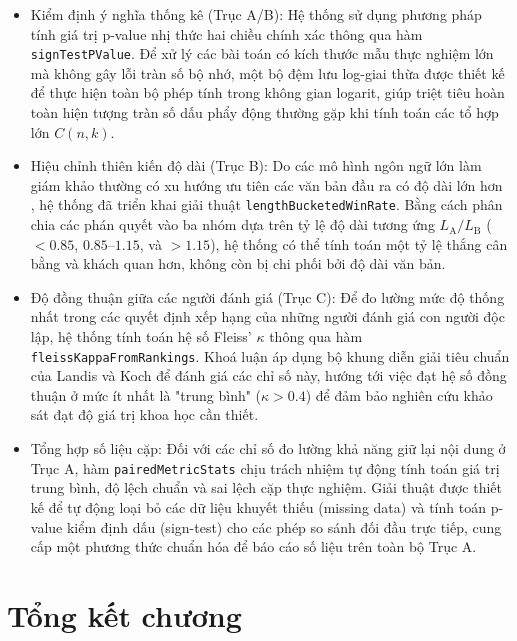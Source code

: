 \begin{itemize}
  \item Kiểm định ý nghĩa thống kê (Trục A/B): Hệ thống sử dụng phương pháp tính giá trị p-value nhị thức hai chiều chính xác thông qua hàm \texttt{signTestPValue}. Để xử lý các bài toán có kích thước mẫu thực nghiệm lớn mà không gây lỗi tràn số bộ nhớ, một bộ đệm lưu log-giai thừa được thiết kế để thực hiện toàn bộ phép tính trong không gian logarit, giúp triệt tiêu hoàn toàn hiện tượng tràn số dấu phẩy động thường gặp khi tính toán các tổ hợp lớn $C(n, k)$.
  \item Hiệu chỉnh thiên kiến độ dài (Trục B): Do các mô hình ngôn ngữ lớn làm giám khảo thường có xu hướng ưu tiên các văn bản đầu ra có độ dài lớn hơn \cite{Dubois2024}, hệ thống đã triển khai giải thuật \texttt{length}\allowbreak\texttt{Bucketed}\allowbreak\texttt{WinRate}. Bằng cách phân chia các phán quyết vào ba nhóm dựa trên tỷ lệ độ dài tương ứng $L_{\text{A}}/L_{\text{B}}$ ($<0.85$, $0.85$--$1.15$, và $>1.15$), hệ thống có thể tính toán một tỷ lệ thắng cân bằng và khách quan hơn, không còn bị chi phối bởi độ dài văn bản.
  \item Độ đồng thuận giữa các người đánh giá (Trục C): Để đo lường mức độ thống nhất trong các quyết định xếp hạng của những người đánh giá con người độc lập, hệ thống tính toán hệ số Fleiss' $\kappa$ thông qua hàm \texttt{fleiss}\allowbreak\texttt{Kappa}\allowbreak\texttt{From}\allowbreak\texttt{Rankings}. Khoá luận áp dụng bộ khung diễn giải tiêu chuẩn của Landis và Koch \cite{Landis1977} để đánh giá các chỉ số này, hướng tới việc đạt hệ số đồng thuận ở mức ít nhất là "trung bình" ($\kappa > 0.4$) để đảm bảo nghiên cứu khảo sát đạt độ giá trị khoa học cần thiết.
  \item Tổng hợp số liệu cặp: Đối với các chỉ số đo lường khả năng giữ lại nội dung ở Trục A, hàm \texttt{paired}\allowbreak\texttt{Metric}\allowbreak\texttt{Stats} chịu trách nhiệm tự động tính toán giá trị trung bình, độ lệch chuẩn và sai lệch cặp thực nghiệm. Giải thuật được thiết kế để tự động loại bỏ các dữ liệu khuyết thiếu (missing data) và tính toán p-value kiểm định dấu (sign-test) cho các phép so sánh đối đầu trực tiếp, cung cấp một phương thức chuẩn hóa để báo cáo số liệu trên toàn bộ Trục A.
\end{itemize}

\section{Tổng kết chương}

